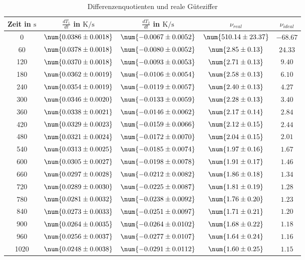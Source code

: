 \begin{table} 
 \centering 
 \begin{tabular}{S S S S S } 
 \toprule  
{Zeit in $\si{\second}$} & {$\frac{dT_1}{dt}$ in $\si{\kelvin \per \second}$} & {$\frac{dT_2}{dt}$ in $\si{\kelvin \per \second}$} & {$\nu_{real}$}& {$\nu_{ideal}$} \\ 
 & $\num{ 0.0386 \pm 0.0018 }$ & $\num{ -0.0067 \pm 0.0052 }$ & $\num{ 510.14 \pm 23.37 }$ & $\num{ -68.67 }$\\ 
60 & $\num{ 0.0378 \pm 0.0018 }$ & $\num{ -0.0080 \pm 0.0052 }$ & $\num{ 2.85 \pm 0.13 }$ & $\num{ 24.33 }$\\ 
120 & $\num{ 0.0370 \pm 0.0018 }$ & $\num{ -0.0093 \pm 0.0053 }$ & $\num{ 2.71 \pm 0.13 }$ & $\num{ 9.40 }$\\ 
180 & $\num{ 0.0362 \pm 0.0019 }$ & $\num{ -0.0106 \pm 0.0054 }$ & $\num{ 2.58 \pm 0.13 }$ & $\num{ 6.10 }$\\ 
240 & $\num{ 0.0354 \pm 0.0019 }$ & $\num{ -0.0119 \pm 0.0057 }$ & $\num{ 2.40 \pm 0.13 }$ & $\num{ 4.27 }$\\ 
300 & $\num{ 0.0346 \pm 0.0020 }$ & $\num{ -0.0133 \pm 0.0059 }$ & $\num{ 2.28 \pm 0.13 }$ & $\num{ 3.40 }$\\ 
360 & $\num{ 0.0338 \pm 0.0021 }$ & $\num{ -0.0146 \pm 0.0062 }$ & $\num{ 2.17 \pm 0.14 }$ & $\num{ 2.84 }$\\ 
420 & $\num{ 0.0329 \pm 0.0023 }$ & $\num{ -0.0159 \pm 0.0066 }$ & $\num{ 2.12 \pm 0.15 }$ & $\num{ 2.44 }$\\ 
480 & $\num{ 0.0321 \pm 0.0024 }$ & $\num{ -0.0172 \pm 0.0070 }$ & $\num{ 2.04 \pm 0.15 }$ & $\num{ 2.01 }$\\ 
540 & $\num{ 0.0313 \pm 0.0025 }$ & $\num{ -0.0185 \pm 0.0074 }$ & $\num{ 1.97 \pm 0.16 }$ & $\num{ 1.67 }$\\ 
600 & $\num{ 0.0305 \pm 0.0027 }$ & $\num{ -0.0198 \pm 0.0078 }$ & $\num{ 1.91 \pm 0.17 }$ & $\num{ 1.46 }$\\ 
660 & $\num{ 0.0297 \pm 0.0028 }$ & $\num{ -0.0212 \pm 0.0082 }$ & $\num{ 1.86 \pm 0.18 }$ & $\num{ 1.34 }$\\ 
720 & $\num{ 0.0289 \pm 0.0030 }$ & $\num{ -0.0225 \pm 0.0087 }$ & $\num{ 1.81 \pm 0.19 }$ & $\num{ 1.28 }$\\ 
780 & $\num{ 0.0281 \pm 0.0032 }$ & $\num{ -0.0238 \pm 0.0092 }$ & $\num{ 1.76 \pm 0.20 }$ & $\num{ 1.23 }$\\ 
840 & $\num{ 0.0273 \pm 0.0033 }$ & $\num{ -0.0251 \pm 0.0097 }$ & $\num{ 1.71 \pm 0.21 }$ & $\num{ 1.20 }$\\ 
900 & $\num{ 0.0264 \pm 0.0035 }$ & $\num{ -0.0264 \pm 0.0102 }$ & $\num{ 1.68 \pm 0.22 }$ & $\num{ 1.18 }$\\ 
960 & $\num{ 0.0256 \pm 0.0037 }$ & $\num{ -0.0277 \pm 0.0107 }$ & $\num{ 1.64 \pm 0.24 }$ & $\num{ 1.16 }$\\ 
1020 & $\num{ 0.0248 \pm 0.0038 }$ & $\num{ -0.0291 \pm 0.0112 }$ & $\num{ 1.60 \pm 0.25 }$ & $\num{ 1.15 }$\\ 
\bottomrule 
 \end{tabular} 
 \caption{Differenzenquotienten und reale Güteziffer} 
 \label{tab: dTdt} 
  \end{table}